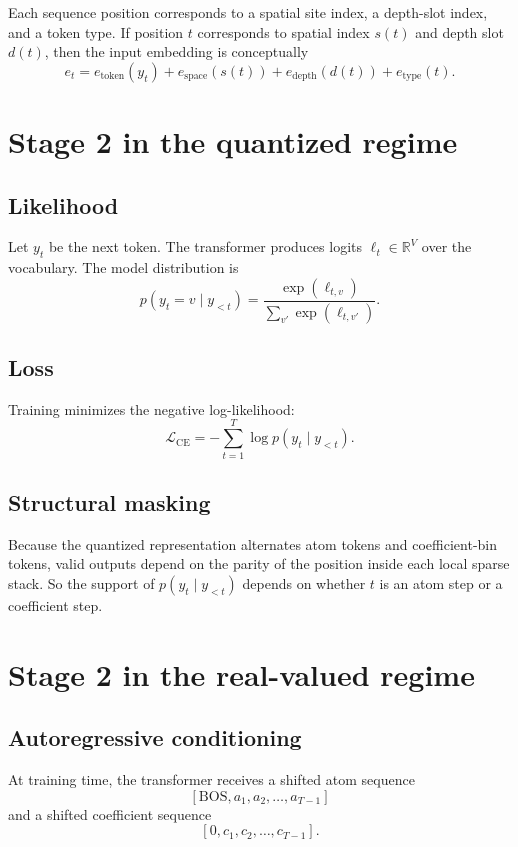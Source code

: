 \documentclass[11pt]{article}
\newcommand{\R}{\mathbb{R}}
\begin{document}
Each sequence position corresponds to a spatial site index, a depth-slot index, and a token type. If position $t$ corresponds to spatial index $s(t)$ and depth slot $d(t)$, then the input embedding is conceptually
\[
e_t
=
e_{\text{token}}(y_t)
+
e_{\text{space}}(s(t))
+
e_{\text{depth}}(d(t))
+
e_{\text{type}}(t).
\]

\section{Stage 2 in the quantized regime}

\subsection{Likelihood}

Let $y_t$ be the next token. The transformer produces logits $\ell_t \in \R^V$ over the vocabulary. The model distribution is
\[
p(y_t = v \mid y_{<t})
=
\frac{\exp(\ell_{t,v})}{\sum_{v'} \exp(\ell_{t,v'})}.
\]

\subsection{Loss}

Training minimizes the negative log-likelihood:
\[
\mathcal{L}_{\text{CE}}
=
-
\sum_{t=1}^{T}
\log p(y_t \mid y_{<t}).
\]

\subsection{Structural masking}

Because the quantized representation alternates atom tokens and coefficient-bin tokens, valid outputs depend on the parity of the position inside each local sparse stack. So the support of $p(y_t \mid y_{<t})$ depends on whether $t$ is an atom step or a coefficient step.

\section{Stage 2 in the real-valued regime}

\subsection{Autoregressive conditioning}

At training time, the transformer receives a shifted atom sequence
\[
[\text{BOS}, a_1, a_2, \dots, a_{T-1}]
\]
and a shifted coefficient sequence
\[
[0, c_1, c_2, \dots, c_{T-1}].
\]
\end{document}
